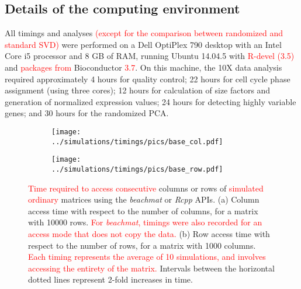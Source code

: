 \documentclass{article}
\newcommand{\beachmat}{\textit{beachmat}}
\newcommand{\revised}[1]{\textcolor{red}{#1}}
\begin{document}
\subsection{Details of the computing environment}
\label{sec:systemdetails}
All timings and analyses \revised{(except for the comparison between randomized and standard SVD)} were performed on a Dell OptiPlex 790 desktop with an Intel Core i5 processor and 8 GB of RAM, running Ubuntu 14.04.5 with \revised{R-devel (3.5)} and \revised{packages from} Bioconductor \revised{3.7}.
On this machine, the 10X data analysis required approximately 4 hours for quality control;
22 hours for cell cycle phase assignment (using three cores);
12 hours for calculation of size factors and generation of normalized expression values;
24 hours for detecting highly variable genes;
and 30 hours for the randomized PCA.




\newpage

\begin{figure}[bt]
    \centering
    \begin{subfigure}[b]{0.49\textwidth}
        \texttt{[image: ../simulations/timings/pics/base\_col.pdf]}
        \caption{}
    \end{subfigure}
    \begin{subfigure}[b]{0.49\textwidth}
        \texttt{[image: ../simulations/timings/pics/base\_row.pdf]}
        \caption{}
    \end{subfigure}
    \caption{\revised{Time required to access consecutive} columns or rows of \revised{simulated ordinary} matrices using the \beachmat{} or \textit{Rcpp} APIs.
        (a) Column access time with respect to the number of columns, for a matrix with 10000 rows.
        \revised{For \beachmat{}, timings were also recorded for an access mode that does not copy the data.}
        (b) Row access time with respect to the number of rows, for a matrix with 1000 columns.
        \revised{Each timing represents the average of 10 simulations, and involves accessing the entirety of the matrix.}
        Intervals between the horizontal dotted lines represent 2-fold increases in time.
    }
    \label{fig:basetime}
\end{figure}
\end{document}
